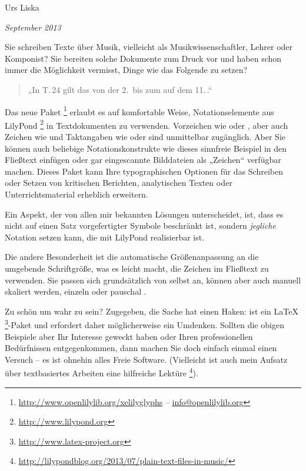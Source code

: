 \documentclass[oneside,11pt]{article}
\begin{document}
\begin{center}
{ \Huge \xelilyglyphs }

\bigskip
{ \Large Urs Liska }

\emph{September 2013}

\end{center}

\bigskip

Sie schreiben Texte über Musik, vielleicht als Musikwissenschaftler, Lehrer oder Komponist?
Sie bereiten solche Dokumente zum Druck vor und haben schon immer die Möglichkeit vermisst, Dinge wie das Folgende zu setzen?

\begin{quote}
„In T.\,24 gilt das \decrescHairpin{} von der 2.\,\halfNote{} bis zum  auf dem 11.\,\semiquaverDown[raise=-.5].“
\end{quote}

Das neue Paket \xelilyglyphs{}%
\footnote{\url{http://www.openlilylib.org/xelilyglyphs} -- \href{mailto:info@openlilylib.org}{info@openlilylib.org}}
erlaubt es auf komfortable Weise, Notationselemente aus LilyPond%
\footnote{\url{http://www.lilypond.org}}
in Textdokumenten zu verwenden.
Vorzeichen wie \flat{} oder \sharp, aber auch Zeichen wie \hspace{.5ex}\fermata{} und Taktangaben wie \lilyTimeCHalf{} oder  sind unmittelbar zugänglich.
Aber Sie können auch beliebige Notationskonstrukte wie \lilyFancyExample{} dieses sinnfreie Beispiel in den Fließtext einfügen oder gar eingescannte Bilddateien als „Zeichen“ verfügbar machen.
Dieses Paket kann Ihre typographischen Optionen für das Schreiben oder Setzen von kritischen Berichten, analytischen Texten oder Unterrichtsmaterial erheblich erweitern.

Ein Aspekt, der \xelilyglyphs{} von allen mir bekannten Lösungen unterscheidet, ist, dass es nicht auf einen Satz vorgefertigter Symbole beschränkt ist, sondern \emph{jegliche} Notation setzen kann, die mit LilyPond realisierbar ist.

\footnotesize
Die andere Besonderheit ist die \halfNoteRest{} automatische Größenanpassung an die umgebende Schriftgröße,
\large was es leicht macht, die \halfNoteRest{} Zeichen im Fließtext zu verwenden.
\normalsize
Sie passen sich grundsätzlich von selbst an, können aber auch \clefF[scale=.4] manuell skaliert werden, einzeln oder pauschal \clefG[scale=1.3,raise=-2.9].

\medskip
Zu schön um wahr zu sein?
Zugegeben, die Sache hat einen Haken: \xelilyglyphs{} ist ein \LaTeX{}%
\footnote{\url{http://www.latex-project.org}}-Paket und erfordert daher möglicherweise ein Umdenken.
Sollten die obigen Beispiele aber Ihr Interesse geweckt haben oder Ihren professionellen Bedürfnissen entgegenkommen, dann machen Sie doch einfach einmal einen Versuch -- es ist ohnehin alles Freie Software.
(Vielleicht ist auch mein Aufsatz über textbasiertes Arbeiten eine hilfreiche Lektüre%
\footnote{\url{http://lilypondblog.org/2013/07/plain-text-files-in-music/}}).
\end{document}
